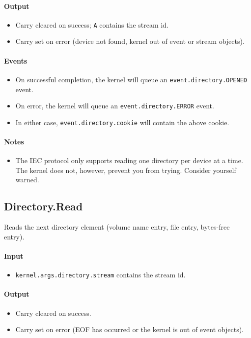 \paragraph{Output}
\begin{itemize}
\item Carry cleared on success; \verb+A+ contains the stream id.
\item Carry set on error (device not found, kernel out of event or stream objects).
\end{itemize}

\paragraph{Events}
\begin{itemize}
\item On successful completion, the kernel will queue an \verb+event.directory.OPENED+ event.
\item On error, the kernel will queue an \verb+event.directory.ERROR+ event.
\item In either case, \verb+event.directory.cookie+ will contain the above cookie.
\end{itemize}

\paragraph{Notes}
\begin{itemize}
\item The IEC protocol only supports reading one directory per device at a time.  The kernel does not, however, prevent you from trying.  Consider yourself warned.
\end{itemize}

\subsection*{Directory.Read}
Reads the next directory element (volume name entry, file entry, bytes-free entry).

\paragraph{Input} 
\begin{itemize}
\item \verb+kernel.args.directory.stream+ contains the stream id.
\end{itemize}

\paragraph{Output}
\begin{itemize}
\item Carry cleared on success.
\item Carry set on error (EOF has occurred or the kernel is out of event objects).
\end{itemize}

